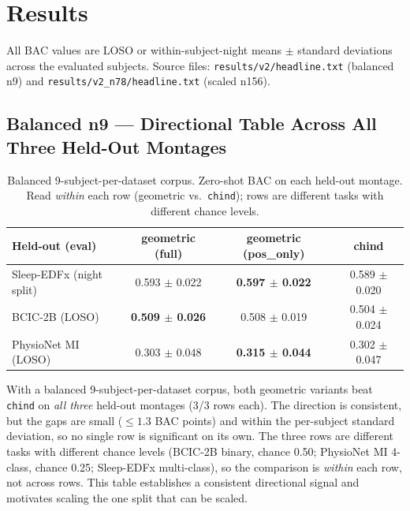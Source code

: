 \documentclass[11pt]{article}
\begin{document}
\section{Results}
\label{sec:results}

All BAC values are LOSO or within-subject-night means $\pm$ standard
deviations across the evaluated subjects. Source files:
\texttt{results/v2/headline.txt} (balanced n9) and
\texttt{results/v2\_n78/headline.txt} (scaled n156).

\subsection{Balanced n9 --- Directional Table Across All Three Held-Out Montages}
\label{sec:results:n9}

\begin{table}[h]
\centering
\caption{Balanced 9-subject-per-dataset corpus. Zero-shot BAC on each
held-out montage. Read \emph{within} each row (geometric vs.\ \texttt{chind});
rows are different tasks with different chance levels.}
\label{tab:n9}
\small
\begin{tabular}{lccc}
\toprule
\textbf{Held-out (eval)} & \textbf{geometric (full)} & \textbf{geometric (pos\_only)} & \textbf{chind} \\
\midrule
Sleep-EDFx (night split) & 0.593 $\pm$ 0.022 & \textbf{0.597 $\pm$ 0.022} & 0.589 $\pm$ 0.020 \\
BCIC-2B (LOSO)           & \textbf{0.509 $\pm$ 0.026} & 0.508 $\pm$ 0.019 & 0.504 $\pm$ 0.024 \\
PhysioNet MI (LOSO)      & 0.303 $\pm$ 0.048 & \textbf{0.315 $\pm$ 0.044} & 0.302 $\pm$ 0.047 \\
\bottomrule
\end{tabular}
\end{table}

With a balanced 9-subject-per-dataset corpus, both geometric variants beat
\texttt{chind} on \emph{all three} held-out montages (3/3 rows each). The
direction is consistent, but the gaps are small ($\leq 1.3$ BAC points) and
within the per-subject standard deviation, so no single row is significant on
its own. The three rows are different tasks with different chance levels
(BCIC-2B binary, chance 0.50; PhysioNet MI 4-class, chance 0.25; Sleep-EDFx
multi-class), so the comparison is \emph{within} each row, not across rows.
This table establishes a consistent directional signal and motivates scaling
the one split that can be scaled.
\end{document}
